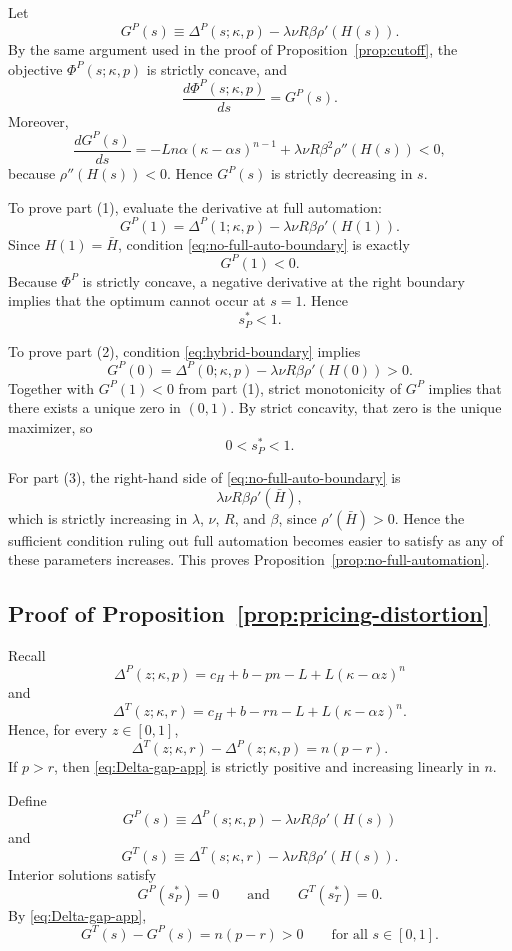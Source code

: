Let
\[
G^P(s)\equiv \Delta^P(s;\kappa,p)-\lambda \nu R \beta \rho'(H(s)).
\]
By the same argument used in the proof of Proposition~\ref{prop:cutoff}, the objective $\Phi^P(s;\kappa,p)$ is strictly concave, and
\[
\frac{d\Phi^P(s;\kappa,p)}{ds}=G^P(s).
\]
Moreover,
\[
\frac{dG^P(s)}{ds}
=
-Ln\alpha(\kappa-\alpha s)^{n-1}
+
\lambda \nu R \beta^2 \rho''(H(s))
<0,
\]
because $\rho''(H(s))<0$. Hence $G^P(s)$ is strictly decreasing in $s$.

To prove part (1), evaluate the derivative at full automation:
\[
G^P(1)=\Delta^P(1;\kappa,p)-\lambda \nu R \beta \rho'(H(1)).
\]
Since $H(1)=\bar H$, condition \eqref{eq:no-full-auto-boundary} is exactly
\[
G^P(1)<0.
\]
Because $\Phi^P$ is strictly concave, a negative derivative at the right boundary implies that the optimum cannot occur at $s=1$. Hence
\[
s_P^\ast<1.
\]

To prove part (2), condition \eqref{eq:hybrid-boundary} implies
\[
G^P(0)=\Delta^P(0;\kappa,p)-\lambda \nu R \beta \rho'(H(0))>0.
\]
Together with $G^P(1)<0$ from part (1), strict monotonicity of $G^P$ implies that there exists a unique zero in $(0,1)$. By strict concavity, that zero is the unique maximizer, so
\[
0<s_P^\ast<1.
\]

For part (3), the right-hand side of \eqref{eq:no-full-auto-boundary} is
\[
\lambda \nu R \beta \rho'(\bar H),
\]
which is strictly increasing in $\lambda$, $\nu$, $R$, and $\beta$, since $\rho'(\bar H)>0$. Hence the sufficient condition ruling out full automation becomes easier to satisfy as any of these parameters increases. This proves Proposition~\ref{prop:no-full-automation}.

\subsection*{Proof of Proposition~\ref{prop:pricing-distortion}}

Recall
\[
\Delta^P(z;\kappa,p)
=
c_H+b-pn-L+L(\kappa-\alpha z)^n
\]
and
\[
\Delta^T(z;\kappa,r)
=
c_H+b-rn-L+L(\kappa-\alpha z)^n.
\]
Hence, for every $z\in[0,1]$,
\begin{equation}
\label{eq:Delta-gap-app}
\Delta^T(z;\kappa,r)-\Delta^P(z;\kappa,p)=n(p-r).
\end{equation}
If $p>r$, then \eqref{eq:Delta-gap-app} is strictly positive and increasing linearly in $n$.

Define
\[
G^P(s)\equiv \Delta^P(s;\kappa,p)-\lambda \nu R \beta \rho'(H(s))
\]
and
\[
G^T(s)\equiv \Delta^T(s;\kappa,r)-\lambda \nu R \beta \rho'(H(s)).
\]
Interior solutions satisfy
\[
G^P(s_P^\ast)=0
\qquad\text{and}\qquad
G^T(s_T^\ast)=0.
\]
By \eqref{eq:Delta-gap-app},
\begin{equation}
\label{eq:G-gap-app}
G^T(s)-G^P(s)=n(p-r)>0
\qquad
\text{for all } s\in[0,1].
\end{equation}

